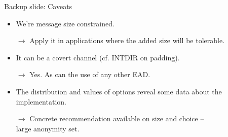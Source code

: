 \begin{frame}{Backup slide: Caveats}\Large
  \begin{itemize}
    \item We're message size constrained.

      $\to$ Apply it in applications where the added size will be tolerable.

    \item It can be a covert channel (cf. INTDIR on padding).

      $\to$ Yes. As can the use of any other EAD.

    \item The distribution and values of options reveal some data about the implementation.

      $\to$ Concrete recommendation available on size and choice -- \\large anonymity set.
  \end{itemize}
\end{frame}


